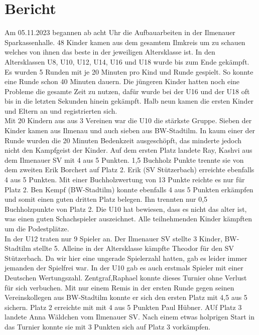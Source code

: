 \documentclass[a4paper,ngerman]{tui-algo-seminar}
\title{\content}
\author{Erik Skopp}
\begin{document}
	
	\maketitle
\thispagestyle{plain} %

\begin{abstract}
Der Bericht beschreibt die Kreiseinzelmeisterschaft der Jugend aus dem Ilm-Kreis. Gespielt wurde mit 20min in 5 Runden. Die Altersklassen erstreckten sich von U10 bis U18. U16 und U18 spielten zusammen in einem Turnier. 
\end{abstract}

\section{Bericht}
Am 05.11.2023 begannen ab acht Uhr die Aufbauarbeiten in der Ilmenauer Sparkassenhalle. 48 Kinder kamen aus dem gesamtem Ilmkreis um zu schauen welches von ihnen das beste in der jeweiligen Altersklasse ist. In den Altersklassen U8, U10, U12, U14, U16 und U18 wurde bis zum Ende gekämpft. Es wurden 5 Runden mit je 20 Minuten pro Kind und Runde gespielt. So konnte eine Runde schon 40 Minuten dauern. Die jüngeren Kinder hatten noch eine Probleme die gesamte Zeit zu nutzen, dafür wurde bei der U16 und der U18 oft bis in die letzten Sekunden hinein gekämpft. Halb neun kamen die ersten Kinder und Eltern an und registrierten sich.\\
Mit 20 Kindern aus aus 3 Vereinen war die U10 die stärkste Gruppe. Sieben der Kinder kamen aus Ilmenau und auch sieben aus BW-Stadtilm. In kaum einer der Runde wurden die 20 Minuten Bedenkzeit ausgeschöpft, das minderte jedoch nicht den Kampfgeist der Kinder. Auf dem ersten Platz landete 	Ray, Kashvi aus dem Ilmenauer SV mit 4 aus 5 Punkten. 1,5 Buchholz Punkte trennte sie von dem zweiten Erik Borchert auf Platz 2. Erik (SV Stützerbach) erreichte ebenfalls 4 aus 5 Punkten. Mit einer Buchholzwertung von 13 Punkte reichte es nur für Platz 2. Ben Kempf (BW-Stadtilm) konnte ebenfalls 4 aus 5 Punkten erkämpfen und somit einen guten dritten Platz belegen. Ihn trennten nur 0,5 Buchholzpunkte von Platz 2. Die U10 hat bewiesen, dass es nicht das alter ist, was einen guten Schachspieler auszeichnet. Alle teilnehmenden Kinder kämpften um die Podestplätze.\\
In der U12 traten nur 9 Spieler an. Der Ilmenauer SV stellte 3 Kinder, BW-Stadtilm stellte 5. Alleine in der Altersklasse kämpfte Theodor für den SV Stützerbach. Da wir hier eine ungerade Spielerzahl hatten, gab es leider immer jemanden der Spielfrei war. In der U10 gab es auch erstmals Spieler mit einer Deutschen Wertungszahl. Zentgraf,Raphael konnte dieses Turnier ohne Verlust für sich verbuchen. Mit nur einem Remis in der ersten Runde gegen seinen Vereinskollegen aus BW-Stadtilm konnte er sich den ersten Platz mit 4,5 aus 5 sichern. Platz 2 erreichte mit mit 4 aus 5 Punkten Paul Hübner. AUf Platz 3 landete Anna Wäldchen vom Ilmenauer SV. Nach einem etwas holprigen Start in das Turnier konnte sie mit 3 Punkten sich auf Platz 3 vorkämpfen. \\
\end{document}
